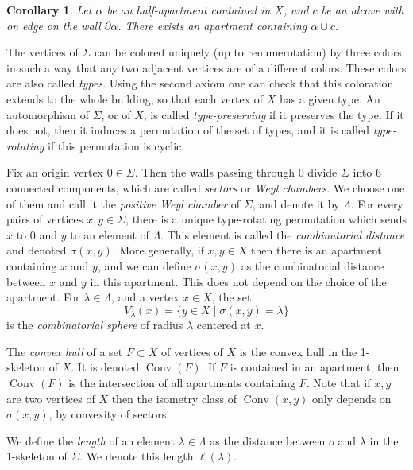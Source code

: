 \documentclass[a4paper, 11pt]{article}
\theoremstyle{plain}
\newtheorem{corollary}[proposition]{Corollary}
\theoremstyle{definition}
\theoremstyle{remark}
\DeclareMathOperator{\Conv}{Conv}
\begin{document}
 

\begin{corollary}\label{cor:root+alcove}
Let $\alpha$ be an half-apartment contained in $X$, and $c$ be an alcove with on edge on the wall $\partial\alpha$. There exists an apartment containing $\alpha\cup c$.
\end{corollary}

The vertices of $\Sigma$ can be colored uniquely (up to renumerotation) by three colors in such a way that any two adjacent vertices are of a different colors. These colors are also called \emph{types}. Using the second axiom one can check that this coloration extends to the whole building, so that each vertex of $X$ has a given type. An automorphism of $\Sigma$, or of $X$, is called \emph{type-preserving} if it preserves the type. If it does not, then it induces a permutation of the set of types, and it is called \emph{type-rotating} if this permutation is cyclic.

Fix an origin vertex $0\in \Sigma$. Then the walls passing through $0$ divide $\Sigma$ into 6 connected components, which are called \emph{sectors} or \emph{Weyl chambers}. We choose one of them and call it the \emph{positive Weyl chamber} of $\Sigma$, and denote it by $\Lambda$. For every pairs of vertices $x,y\in \Sigma$, there is a unique type-rotating permutation which sends $x$ to $0$ and $y$ to an element of $\Lambda$. This element is called the \emph{combinatorial distance} and denoted $\sigma(x,y)$. More generally, if $x,y\in X$ then there is an apartment containing $x$ and $y$, and we can define $\sigma(x,y)$ as the combinatorial distance between $x$ and $y$ in this apartment. This does not depend on the choice of the apartment.
For $\lambda\in \Lambda$, and a vertex $x\in X$, the set 
$$V_\lambda(x)= \{y\in X \mid \sigma(x,y) = \lambda\}$$
is the \emph{combinatorial sphere} of radius $\lambda$ centered at $x$.

The \emph{convex hull} of a set $F\subset X$ of vertices of $X$ is the convex hull in the 1-skeleton of $X$. It is denoted $\Conv(F)$\index{$\Conv$ \hfill convex hull in the 1-skeleton of $X$|bb}. If $F$ is contained in an apartment, then $\Conv(F)$ is the intersection of all apartments containing $F$. Note that if $x,y$ are two vertices of $X$ then the isometry class of $\Conv(x,y)$ only depends on $\sigma(x,y)$, by convexity of sectors.

We define the \emph{length} of an element $\lambda\in\Lambda$ as the distance between $o$ and $\lambda$ in the 1-skeleton of $\Sigma$. We denote this length $\ell(\lambda)$.
\end{document}
